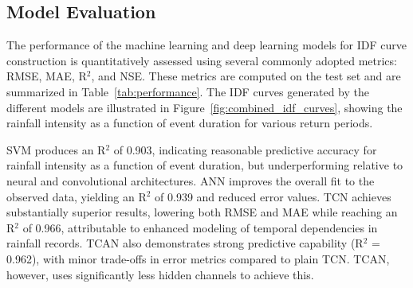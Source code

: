 \subsection{Model Evaluation}
The performance of the machine learning and deep learning models for IDF curve construction is quantitatively assessed using several commonly adopted metrics: RMSE, MAE, R$^{2}$, and NSE\@. These metrics are computed on the test set and are summarized in Table~\ref{tab:performance}.
The IDF curves generated by the different models are illustrated in Figure~\ref{fig:combined_idf_curves}, showing the rainfall intensity as a function of event duration for various return periods.

\vspace{1em}

SVM produces an R$^{2}$ of 0.903, indicating reasonable predictive accuracy for rainfall intensity as a function of event duration, but underperforming relative to neural and convolutional architectures. ANN improves the overall fit to the observed data, yielding an R$^{2}$ of 0.939 and reduced error values. TCN achieves substantially superior results, lowering both RMSE and MAE while reaching an R$^{2}$ of 0.966, attributable to enhanced modeling of temporal dependencies in rainfall records. TCAN also demonstrates strong predictive capability (R$^{2}$ = 0.962), with minor trade-offs in error metrics compared to plain TCN\@. TCAN, however, uses significantly less hidden channels to achieve this.
\vspace{1em}